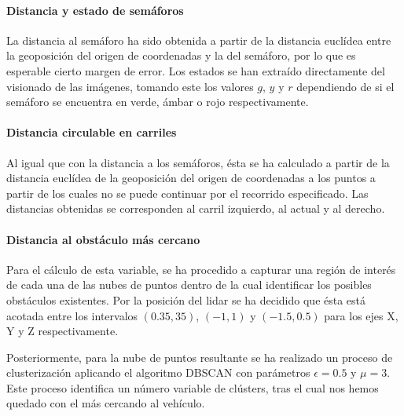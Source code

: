 \paragraph{Distancia y estado de semáforos}

La distancia al semáforo ha sido obtenida a partir de la distancia euclídea entre la geoposición del origen de coordenadas y la del semáforo, por lo que es esperable cierto margen de error. Los estados se han extraído directamente del visionado de las imágenes, tomando este los valores $g$, $y$ y $r$ dependiendo de si el semáforo se encuentra en verde, ámbar o rojo respectivamente.

\paragraph{Distancia circulable en carriles}

Al igual que con la distancia a los semáforos, ésta se ha calculado a partir de la distancia euclídea de la geoposición del origen de coordenadas a los puntos a partir de los cuales no se puede continuar por el recorrido especificado. Las distancias obtenidas se corresponden al carril izquierdo, al actual y al derecho.

\paragraph{Distancia al obstáculo más cercano}

Para el cálculo de esta variable, se ha procedido a capturar una región de interés de cada una de las nubes de puntos dentro de la cual identificar los posibles obstáculos existentes. Por la posición del \acrshort{lidar} se ha decidido que ésta está acotada entre los intervalos $(0.35, 35)$, $(-1, 1)$ y $(-1.5, 0.5)$ para los ejes X, Y y Z respectivamente.

Posteriormente, para la nube de puntos resultante se ha realizado un proceso de clusterización aplicando el algoritmo DBSCAN con parámetros $\epsilon = 0.5$ y $\mu = 3$. Este proceso identifica un número variable de clústers, tras el cual nos hemos quedado con el más cercando al vehículo.

